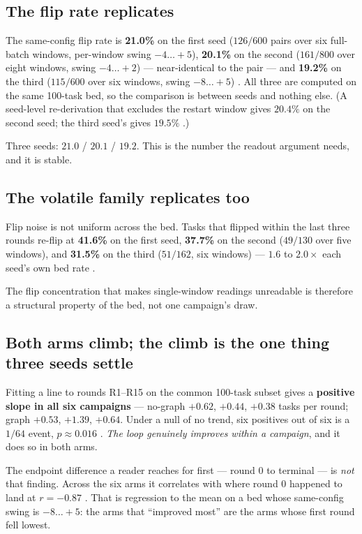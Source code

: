 \subsection*{The flip rate replicates}

The same-config flip rate is \textbf{21.0\%} on the first seed
($126/600$ pairs over six full-batch windows, per-window swing
$-4\ldots{+}5$), \textbf{20.1\%} on the second ($161/800$ over eight
windows, swing $-4\ldots{+}2$) --- near-identical to the pair --- and
\textbf{19.2\%} on the third ($115/600$ over six windows, swing
$-8\ldots{+}5$) . All three are computed on the same 100-task bed,
so the comparison is between seeds and nothing else. (A seed-level
re-derivation that excludes the restart window gives $20.4\%$ on the
second seed; the third seed's gives $19.5\%$ .)

Three seeds: $21.0$ / $20.1$ / $19.2$. This is the number the readout
argument needs, and it is stable.

\subsection*{The volatile family replicates too}

Flip noise is not uniform across the bed. Tasks that flipped within the
last three rounds re-flip at \textbf{41.6\%} on the first seed,
\textbf{37.7\%} on the second ($49/130$ over five windows), and
\textbf{31.5\%} on the third ($51/162$, six windows) --- $1.6$ to
$2.0\times$ each seed's own bed rate .

The flip concentration that makes single-window readings unreadable is
therefore a structural property of the bed, not one campaign's draw.

\subsection*{Both arms climb; the climb is the one thing three seeds
settle}
\label{sec:trend}

Fitting a line to rounds R1--R15 on the common 100-task subset gives a
\textbf{positive slope in all six campaigns} --- no-graph $+0.62$, $+0.44$,
$+0.38$ tasks per round; graph $+0.53$, $+1.39$, $+0.64$. Under a null of
no trend, six positives out of six is a $1/64$ event, $p \approx 0.016$
. \emph{The loop genuinely improves within a campaign}, and it does
so in both arms.

The endpoint difference a reader reaches for first --- round 0 to terminal
--- is \emph{not} that finding. Across the six arms it correlates with
where round 0 happened to land at $r = -0.87$ . That is regression to
the mean on a bed whose same-config swing is $-8\ldots{+}5$: the arms that
``improved most'' are the arms whose first round fell lowest.

